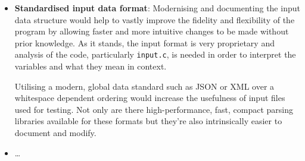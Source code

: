 \documentclass[conference]{IEEEtran}
\begin{document}
\begin{itemize}
    \item \textbf{Standardised input data format}: Modernising and documenting the input data structure would help to vastly improve the fidelity and flexibility of the program by allowing faster and more intuitive changes to be made without prior knowledge. As it stands, the input format is very proprietary and analysis of the code, particularly \texttt{input.c}, is needed in order to interpret the variables and what they mean in context.
    
    Utilising a modern, global data standard such as JSON or XML over a whitespace dependent ordering would increase the usefulness of input files used for testing. Not only are there high-performance, fast, compact parsing libraries available for these formats but they're also intrinsically easier to document and modify.

    \item \dots

\end{itemize}




\end{document}

